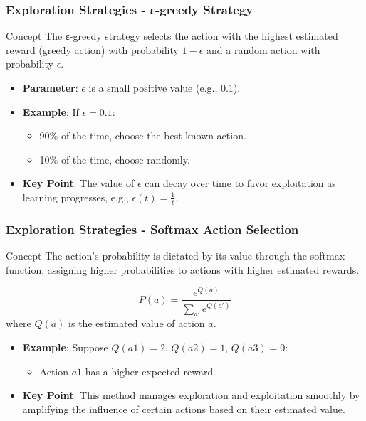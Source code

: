 \documentclass[aspectratio=169]{beamer}
\begin{document}
\begin{frame}[fragile]
    \frametitle{Exploration Strategies - ε-greedy Strategy}
    \begin{block}{Concept}
        The ε-greedy strategy selects the action with the highest estimated reward (greedy action) with probability \(1 - \epsilon\) and a random action with probability \(\epsilon\).
    \end{block}
    \begin{itemize}
        \item \textbf{Parameter}: \(\epsilon\) is a small positive value (e.g., 0.1).
        \item \textbf{Example}: If \(\epsilon = 0.1\):
            \begin{itemize}
                \item 90\% of the time, choose the best-known action.
                \item 10\% of the time, choose randomly.
            \end{itemize}
        \item \textbf{Key Point}: The value of \(\epsilon\) can decay over time to favor exploitation as learning progresses, e.g., \(\epsilon(t) = \frac{1}{t}\).
    \end{itemize}
\end{frame}

\begin{frame}[fragile]
    \frametitle{Exploration Strategies - Softmax Action Selection}
    \begin{block}{Concept}
        The action's probability is dictated by its value through the softmax function, assigning higher probabilities to actions with higher estimated rewards.
    \end{block}
    \begin{equation}
        P(a) = \frac{e^{Q(a)}}{\sum_{a'} e^{Q(a')}}
    \end{equation}
    where \(Q(a)\) is the estimated value of action \(a\).

    \begin{itemize}
        \item \textbf{Example}: Suppose \(Q(a1) = 2\), \(Q(a2) = 1\), \(Q(a3) = 0\):
            \begin{itemize}
                \item Action \(a1\) has a higher expected reward.
            \end{itemize}
        \item \textbf{Key Point}: This method manages exploration and exploitation smoothly by amplifying the influence of certain actions based on their estimated value.
    \end{itemize}
\end{frame}
\end{document}
